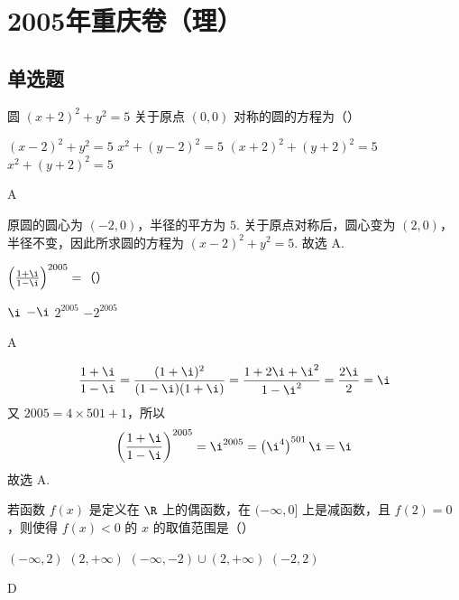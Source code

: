 \chapter{2005年重庆卷（理）}
\section{单选题}
\begin{problem}
圆 \((x + 2)^{2} + y^{2} = 5\) 关于原点 \((0,0)\) 对称的圆的方程为（\quad）

\choices
    {\((x - 2)^{2} + y^{2} = 5\)}
    {\(x^{2} + (y - 2)^{2} = 5\)}
    {\((x + 2)^{2} + (y + 2)^{2} = 5\)}
    {\(x^{2} + (y + 2)^{2} = 5\)}
\end{problem}

\begin{answer}
A
\end{answer}

\begin{solution}
原圆的圆心为 \((-2,0)\)，半径的平方为 \(5\). 关于原点对称后，圆心变为 \((2,0)\)，半径不变，因此所求圆的方程为 \((x-2)^2+y^2=5\).
故选 A.
\end{solution}

\begin{problem}
\(\left(\frac{1 + \i}{1 - \i}\right)^{2005} =\)（\quad）

\choices
    {\(\i\)}
    {\(-\i\)}
    {\(2^{2005}\)}
    {\(-2^{2005}\)}
\end{problem}

\begin{answer}
A
\end{answer}

\begin{solution}
\[
\frac{1+\i}{1-\i}=\frac{(1+\i)^2}{(1-\i)(1+\i)}
=\frac{1+2\i+\i^2}{1-\i^2}=\frac{2\i}{2}=\i
\]
又 \(2005=4\times501+1\)，所以
\[
\left(\frac{1+\i}{1-\i}\right)^{2005}
=\i^{2005}=\left(\i^4\right)^{501}\i=\i
\]
故选 A.
\end{solution}

\begin{problem}
若函数 \( f(x) \) 是定义在 \( \R \) 上的偶函数，在 \((- \infty, 0]\) 上是减函数，且 \( f(2) = 0 \)，则使得 \( f(x) < 0 \) 的 \( x \) 的取值范围是（\quad）

\choices
    {\((-\infty, 2)\)}
    {\((2, +\infty)\)}
    {\((-\infty, -2) \cup (2, +\infty)\)}
    {\((-2, 2)\)}
\end{problem}

\begin{answer}
D
\end{answer}

